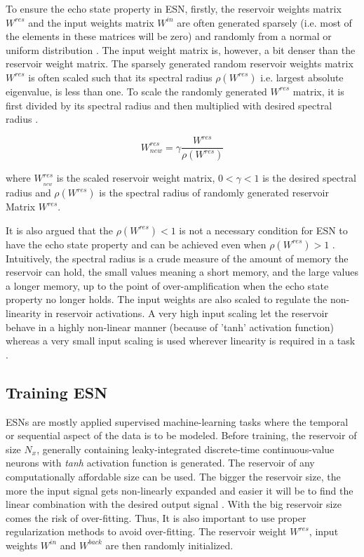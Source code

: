 To ensure the echo state property in ESN, firstly, the reservoir weights matrix $W^{res}$ and the input weights matrix $W^{in}$ are often generated sparsely (i.e. most of the elements in these matrices will be zero) and randomly from a normal or uniform distribution \cite{esn:practical_guide}. The input weight matrix is, however, a bit denser than the reservoir weight matrix. The sparsely generated random reservoir weights matrix $W^{res}$ is often scaled such that its spectral radius $\rho(W^{res})$ i.e. largest absolute eigenvalue, is less than one. To scale the randomly generated $W^{res}$ matrix, it is first divided by its spectral radius and then multiplied with desired spectral radius \cite{esn:jaeger_tutorial}.

\begin{equation}\label{eqn:res_scaling}
W_{new}^{{res}}=\gamma \frac{W^{res}}{\rho(W^{res})}
\end{equation}

where $W_{_{new}}^{{res}}$ is the scaled reservoir weight matrix, $0 < \gamma < 1$ is the desired spectral radius and $\rho(W^{res})$ is the spectral radius of randomly generated reservoir Matrix $W^{res}$.

It is also argued that the $\rho(W^{res}) < 1 $ is not a necessary condition for ESN to have the echo state property and can be achieved even when $\rho(W^{res}) > 1$ \cite{esn:jaeger:2001, esn:practical_guide, esn:jaeger_tutorial}. Intuitively, the spectral radius is a crude measure of the amount of memory the reservoir can hold, the small values meaning a short memory, and the large values a longer memory, up to the point of over-amplification when the echo state property no longer holds. The input weights are also scaled to regulate the non-linearity in reservoir activations. A very high input scaling let the reservoir behave in a highly non-linear manner (because of 'tanh' activation function) whereas a very small input scaling is used wherever linearity is required in a task \cite{esn:practical_guide}.

\subsection{Training ESN}\label{ssec:esn_training}

ESNs are mostly applied supervised machine-learning tasks where the temporal or sequential aspect of the data is to be modeled. Before training, the reservoir of size $N_{x}$, generally containing leaky-integrated discrete-time continuous-value neurons with \textit{tanh} activation function is generated. The reservoir of any computationally affordable size can be used. The bigger the reservoir size, the more the input signal gets non-linearly expanded and easier it will be to find the linear combination with the desired output signal \cite{esn:practical_guide, esn:jaeger_tutorial}. With the big reservoir size comes the risk of over-fitting. Thus, It is also important to use proper regularization methods to avoid over-fitting. The reservoir weight $W^{res}$, input weights $W^{in}$ and $W^{back}$ are then randomly initialized.

